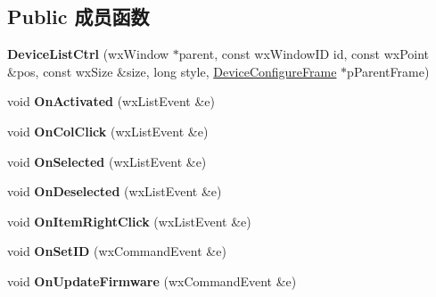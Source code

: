 \subsection*{Public 成员函数}
\begin{DoxyCompactItemize}
\item 
\hypertarget{class_device_list_ctrl_a15fa192743464ef6915e9a836c6d66d4}{{\bfseries Device\+List\+Ctrl} (wx\+Window $\ast$parent, const wx\+Window\+I\+D id, const wx\+Point \&pos, const wx\+Size \&size, long style, \hyperlink{class_device_configure_frame}{Device\+Configure\+Frame} $\ast$p\+Parent\+Frame)}\label{class_device_list_ctrl_a15fa192743464ef6915e9a836c6d66d4}

\item 
\hypertarget{class_device_list_ctrl_ad19b8c6c6ec2b35efa6a6b35809127b5}{void {\bfseries On\+Activated} (wx\+List\+Event \&e)}\label{class_device_list_ctrl_ad19b8c6c6ec2b35efa6a6b35809127b5}

\item 
\hypertarget{class_device_list_ctrl_a2d6d5c462b04582d221f4350f46394d2}{void {\bfseries On\+Col\+Click} (wx\+List\+Event \&e)}\label{class_device_list_ctrl_a2d6d5c462b04582d221f4350f46394d2}

\item 
\hypertarget{class_device_list_ctrl_a0ede4eb183e79505be311f0cd6163c8b}{void {\bfseries On\+Selected} (wx\+List\+Event \&e)}\label{class_device_list_ctrl_a0ede4eb183e79505be311f0cd6163c8b}

\item 
\hypertarget{class_device_list_ctrl_ad27348b2d363e317281a35f628a4fa5f}{void {\bfseries On\+Deselected} (wx\+List\+Event \&e)}\label{class_device_list_ctrl_ad27348b2d363e317281a35f628a4fa5f}

\item 
\hypertarget{class_device_list_ctrl_a93a7b967b632ace4ddaa3364f399a264}{void {\bfseries On\+Item\+Right\+Click} (wx\+List\+Event \&e)}\label{class_device_list_ctrl_a93a7b967b632ace4ddaa3364f399a264}

\item 
\hypertarget{class_device_list_ctrl_a08bd59906c0f7f0a1f2e56d006569791}{void {\bfseries On\+Set\+I\+D} (wx\+Command\+Event \&e)}\label{class_device_list_ctrl_a08bd59906c0f7f0a1f2e56d006569791}

\item 
\hypertarget{class_device_list_ctrl_a7cae849e3953f1d494ff4aadf463c91f}{void {\bfseries On\+Update\+Firmware} (wx\+Command\+Event \&e)}\label{class_device_list_ctrl_a7cae849e3953f1d494ff4aadf463c91f}


\end{DoxyCompactItemize}
